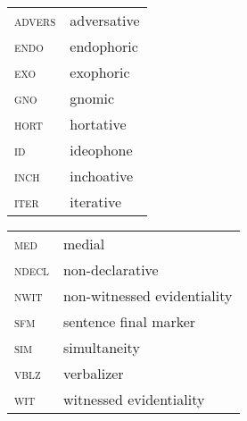 \documentclass[output=paper,
modfonts,nonflat
]{langsci/langscibook}
\begin{document}
\begin{tabularx}{.45\textwidth}{lQ}
\textsc{advers} & adversative \\
\textsc{endo} & endophoric \\
\textsc{exo } & exophoric \\
\textsc{gno} & gnomic \\
\textsc{hort } & hortative \\
\textsc{id } & ideophone \\
\textsc{inch } & inchoative\\
\textsc{iter } & iterative \\
\end{tabularx}
\begin{tabularx}{.45\textwidth}{lQ}
\textsc{med } & medial \\
\textsc{ndecl} & non-declarative \\
\textsc{nwit } & non-witnessed evidentiality \\
\textsc{sfm } & sentence final marker \\
\textsc{sim } & simultaneity \\
\textsc{vblz } & verbalizer \\
\textsc{wit } & witnessed evidentiality \\
\end{tabularx}
 

  
{\sloppy
\printbibliography[heading=subbibliography,notkeyword=this]
}
\end{document}
